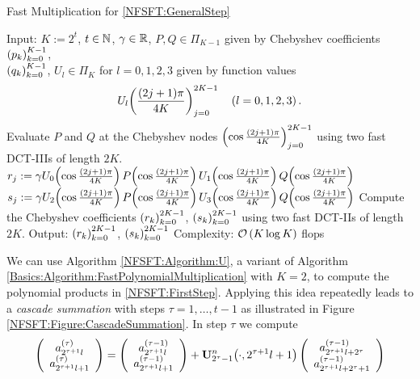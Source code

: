 \begin{algorithm}[tb]
  \caption{Fast Multiplication for \eqref{NFSFT:GeneralStep}}
  \label{NFSFT:Algorithm:U}
  \begin{algorithmic}
    \STATE Input:  $K := 2^t$, $t \in \mathbb{N}$, $\gamma \in \mathbb{R}$, $P,Q \in \Pi_{K-1}$ given by
       Chebyshev coefficients $\left(p_{k}\right)_{k=0}^{K-1}$,\\
    \STATE {} $\left(q_{k}\right)_{k=0}^{K-1}$, $U_{l} \in \Pi_{K}$ for $l=0,1,2,3$ 
      given by function values
      \[U_{l}{\hspace{-0.4ex}}\left(\frac{(2j+1)\pi}{4K}\right)_{j = 0}^{2K-1} \quad \left(l=0,1,2,3\right).\] 
    \STATE Evaluate $P$ and $Q$ at the Chebyshev nodes $\left(\cos \frac{(2j+1)\pi}{4K}\right)_{j = 0}^{2K-1}$
      using two fast DCT-IIIs of length $2K$.
    \STATE 
      \STATE $r_{j} := \gamma U_{0}{\hspace{-0.4ex}}\left(\cos \frac{(2j+1)\pi}{4K}\right) P{\hspace{-0.4ex}}\left(\cos \frac{(2j+1)\pi}{4K}\right)
        U_{1}{\hspace{-0.4ex}}\left(\cos \frac{(2j+1)\pi}{4K}\right) Q{\hspace{-0.4ex}}\left(\cos \frac{(2j+1)\pi}{4K}\right)$
      \STATE $s_{j} := \gamma U_{2}{\hspace{-0.4ex}}\left(\cos \frac{(2j+1)\pi}{4K}\right) P{\hspace{-0.4ex}}\left(\cos \frac{(2j+1)\pi}{4K}\right)
        U_{3}{\hspace{-0.4ex}}\left(\cos \frac{(2j+1)\pi}{4K}\right) Q{\hspace{-0.4ex}}\left(\cos \frac{(2j+1)\pi}{4K}\right)$
    \ENDFOR
    \STATE
    \STATE Compute the Chebyshev coefficients $\left(r_{k}\right)_{k=0}^{2K-1}$, $\left(s_{k}\right)_{k=0}^{2K-1}$ 
      using two fast DCT-IIs of length $2K$.
    \STATE
    \STATE Output: $\left(r_{k}\right)_{k=0}^{2K-1}$, $\left(s_{k}\right)_{k=0}^{2K-1}$
    \STATE Complexity: $\mathcal{O}\left(K \log K\right)$ flops
  \end{algorithmic}
\end{algorithm}  
We can use Algorithm \ref{NFSFT:Algorithm:U}, a variant of Algorithm 
\ref{Basics:Algorithm:FastPolynomialMultiplication} with $K=2$, to compute the polynomial products in 
\eqref{NFSFT:FirstStep}. Applying this idea repeatedly leads to a \emph{cascade 
summation} with steps $\tau=1,\ldots,t-1$ as illustrated in Figure \ref{NFSFT:Figure:CascadeSummation}. 
In step $\tau$ we compute
\begin{equation}
  \label{NFSFT:GeneralStep}
  \left(\begin{array}{c}
    a_{2^{\tau+1}l}^{(\tau)}\\
    a_{2^{\tau+1}l+1}^{(\tau)} 
  \end{array}\right)
  =
  \left(\begin{array}{c}
    a_{2^{\tau+1}l}^{(\tau-1)}\\
    a_{2^{\tau+1}l+1}^{(\tau-1)} 
  \end{array}\right)
  + {\mathbf{U}_{2^{\tau}-1}^{n}{\hspace{-0.4ex}}\left(\cdot,2^{\tau+1}l+1\right)}
  \left(\begin{array}{c}
    a_{2^{\tau+1}l+2^{\tau}}^{(\tau-1)}\\
    a_{2^{\tau+1}l+2^{\tau}+1}^{(\tau-1)} 
  \end{array}\right)
\end{equation}
